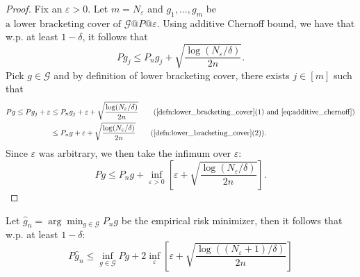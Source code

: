 \documentclass[twoside]{article}
\begin{document}
\begin{proof}
   Fix an $\varepsilon>0$. Let $m=N_\varepsilon$ and $g_1,...,g_m$ be $\text{a lower bracketing cover of }\mathcal G\text{@}P\text{@}\varepsilon$. Using additive Chernoff bound, we have that w.p. at least $1-\delta$, it follows that
   \begin{equation}
      Pg_j\le P_ng_j+\sqrt{\frac{\log(N_\varepsilon/\delta)}{2n}}\label{eq:additive_chernoff}. 
   \end{equation}
   Pick $g\in \mathcal G$ and by definition of lower bracketing cover, there exists $j\in [m]$ such that
   \begin{align*}
      Pg\le Pg_j+\varepsilon&\le P_ng_j + \varepsilon + \sqrt{\frac{\log(N_\varepsilon/\delta)}{2n}}\tag{\cref{defn:lower_bracketing_cover}(1) and \cref{eq:additive_chernoff}}\\
      &\le P_ng+\varepsilon+\sqrt{\frac{\log(N_\varepsilon/\delta)}{2n}}\tag{\cref{defn:lower_bracketing_cover}(2)}.
   \end{align*}
   Since $\varepsilon$ was arbitrary, we then take the infimum over $\varepsilon$:
   \begin{equation*}
      Pg\le P_ng+\inf_{\varepsilon>0}\left[\varepsilon+\sqrt{\frac{\log(N_\varepsilon/\delta)}{2n}}\right].
   \end{equation*}
\end{proof}
\begin{corollary}
   Let $\hat g_n=\arg\min_{g\in \mathcal{G}}P_ng$ be the empirical risk minimizer, then it follows that w.p. at least $1-\delta$:
   \begin{equation*}
      P\hat g_n\le \inf_{g\in \mathcal G}Pg + 2\inf_{\varepsilon}\left[\varepsilon+ \sqrt{\frac{\log((N_\varepsilon+1)/\delta)}{2n}}\right]
   \end{equation*}
\end{corollary}
\end{document}
